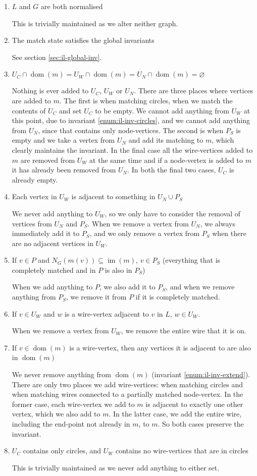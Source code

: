 \documentclass{article}
\DeclareMathOperator{\dom}{dom}
\DeclareMathOperator{\im}{im}
\begin{document}
\begin{enumerate}[label=(\roman*),ref=(\roman*)]
  \item $L$ and $G$ are both normalised

  This is trivially maintained as we alter neither graph.
  \item The match state satisfies the global invariants

  See section \ref{sec:il-global-inv}.
  \item $U_C\cap\dom(m) = U_W\cap\dom(m) = U_N\cap\dom(m) = \varnothing$

  Nothing is ever added to $U_C$, $U_W$ or $U_N$.  There are three places where vertices are added to $m$.  The first is when matching circles, when we match the contents of $U_C$ and set $U_C$ to be empty.  We cannot add anything from $U_W$ at this point, due to invariant \ref{enum:il-inv-circles}, and we cannot add anything from $U_N$, since that contains only node-vertices.  The second is when $P_S$ is empty and we take a vertex from $U_N$ and add its matching to $m$, which clearly maintains the invariant.  In the final case all the wire-vertices added to $m$ are removed from $U_W$ at the same time and if a node-vertex is added to $m$ it has already been removed from $U_N$.  In both the final two cases, $U_C$ is already empty.
  \item Each vertex in $U_W$ is adjacent to something in $U_N\cup P_S$

  We never add anything to $U_W$, so we only have to consider the removal of vertices from $U_N$ and $P_S$.  When we remove a vertex from $U_N$, we always immediately add it to $P_S$, and we only remove a vertex from $P_S$ when there are no adjacent vertices in $U_W$.
  \item If $v \in P$ and $N_G(m(v)) \subseteq \im(m)$, $v \in P_S$ (everything that is completely matched and in $P$ is also in $P_S$)

  When we add anything to $P$, we also add it to $P_S$, and when we remove anything from $P_S$, we remove it from $P$ if it is completely matched.
  \item If $v \in U_W$ and $w$ is a wire-vertex adjacent to $v$ in $L$, $w \in U_W$.

  When we remove a vertex from $U_W$, we remove the entire wire that it is on.
  \item If $v \in \dom(m)$ is a wire-vertex, then any vertices it is adjacent to are also in $\dom(m)$

  We never remove anything from $\dom(m)$ (invariant \ref{enum:il-inv-extend}).  There are only two places we add wire-vertices: when matching circles and when matching wires connected to a partially matched node-vertex.  In the former case, each wire-vertex we add to $m$ is adjacent to exactly one other vertex, which we also add to $m$.  In the latter case, we add the entire wire, including the end-point not already in $m$, to $m$.  So both cases preserve the invariant.
  \item $U_C$ contains only circles, and $U_W$ contains no wire-vertices that are in circles

  This is trivially maintained as we never add anything to either set.
\end{enumerate}
\end{document}

